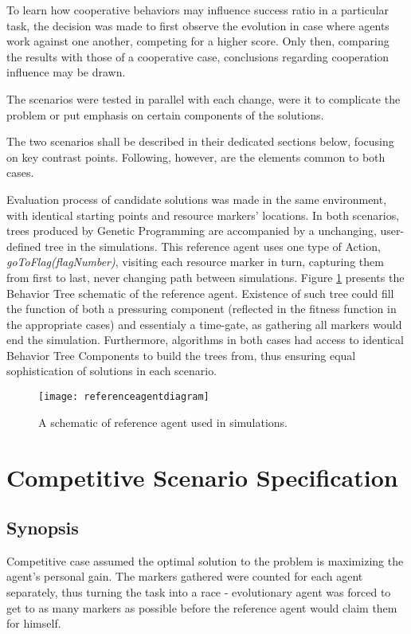 To learn how cooperative behaviors may influence success ratio in a particular task, the decision was made to first observe the evolution in case where agents work against one another, competing for a higher score. Only then, comparing the results with those of a cooperative case, conclusions regarding cooperation influence may be drawn.

The scenarios were tested in parallel with each change, were it to complicate the problem or put emphasis on certain components of the solutions.

The two scenarios shall be described in their dedicated sections below, focusing on key contrast points. Following, however, are the elements common to both cases.

Evaluation process of candidate solutions was made in the same environment, with identical starting points and resource markers' locations. In both scenarios, trees produced by Genetic Programming are accompanied by a unchanging, user-defined tree in the simulations. This reference agent uses one type of Action, \textit{goToFlag(flagNumber)}, visiting each resource marker in turn, capturing them from first to last, never changing path between simulations. Figure \ref{fig:x referenceagentdiagram} presents the Behavior Tree schematic of the reference agent. Existence of such tree could fill the function of both a pressuring component (reflected in the fitness function in the appropriate cases) and essentialy a time-gate, as gathering all markers would end the simulation. Furthermore, algorithms in both cases had access to identical Behavior Tree Components to build the trees from, thus ensuring equal sophistication of solutions in each scenario.

\begin{figure}[h]
    \centering
    \texttt{[image: referenceagentdiagram]}
    \caption{A schematic of reference agent used in simulations.}
    \label{fig:x referenceagentdiagram}
\end{figure}
\section{Competitive Scenario Specification}
\subsection{Synopsis}
Competitive case assumed the optimal solution to the problem is maximizing the agent's personal gain. The markers gathered were counted for each agent separately, thus turning the task into a race - evolutionary agent was forced to get to as many markers as possible before the reference agent would claim them for himself.

